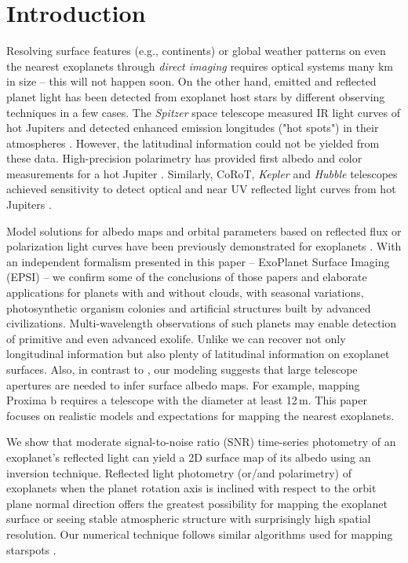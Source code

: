 \documentclass{emulateapj}
\begin{document}
\section{Introduction}

Resolving surface features (e.g., continents) or global weather patterns on even 
the nearest exoplanets through {\em direct imaging} requires optical systems many km in size 
-- this will not happen soon. On the other hand, emitted and reflected planet light has been 
detected from exoplanet host stars by different observing techniques in a few cases.
The {\em Spitzer} space telescope measured IR light curves of hot Jupiters and detected 
enhanced emission longitudes ("hot spots") in their atmospheres \citep[e.g.,][]{har06,knu07,cow08,cro10}. 
However, the latitudinal information could not be yielded from these data.
High-precision polarimetry has provided first albedo and color measurements
for a hot Jupiter \citep{berdetal2008,berdetal2011}.
Similarly, CoRoT, {\em Kepler} and {\em Hubble} telescopes achieved sensitivity to detect optical 
and near UV reflected light curves from hot Jupiters \citep[e.g.,][]{corot,kepler1,kepler2,hubble}.

Model solutions for albedo maps and orbital parameters based on reflected 
flux or polarization light curves have been previously demonstrated for exoplanets 
\citep[e.g.,][]{cow09,fluri&berd2010,kf11,fk12,sch16}.
With an independent formalism presented in this paper -- ExoPlanet Surface Imaging (EPSI) -- 
we confirm some of the conclusions of those papers
and elaborate applications for planets with and without clouds, with seasonal variations,
photosynthetic organism colonies and artificial structures
built by advanced civilizations. Multi-wavelength observations of such planets may enable 
detection of primitive and even advanced exolife. 
Unlike \cite{cow09} we can recover not only longitudinal information but also plenty
of latitudinal information on exoplanet surfaces. Also, in contrast to \cite{fk12}, 
our modeling suggests that large telescope apertures are needed to infer surface albedo maps. 
For example, mapping Proxima b requires a telescope with the diameter at least 12\,m. 
This paper focuses on  realistic models and expectations for mapping the nearest exoplanets.

We show that moderate signal-to-noise ratio (SNR) time-series
photometry of an exoplanet's reflected light can yield a 2D surface map 
of its albedo using an inversion technique.
Reflected light photometry (or/and polarimetry) of exoplanets when the planet 
rotation axis is inclined with respect to the orbit plane normal direction
offers the greatest possibility for mapping the exoplanet surface or seeing stable 
atmospheric structure with surprisingly high spatial resolution. 
Our numerical technique follows similar algorithms used for mapping 
starspots \citep{berd1998, berdetal1998, berdetal2002}.
\end{document}
